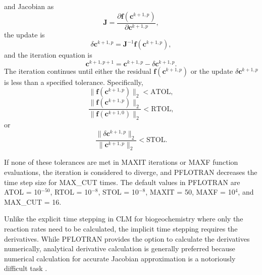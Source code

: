 \documentclass[gmd, manuscript]{copernicus}
\begin{document}
and Jacobian as
\begin{equation}
\mathbf{J} = \frac{\partial \mathbf{f}(\mathbf{c}^{k+1,p})}{\partial \mathbf{c}^{k+1,p}},
\label{eq:jacobian}
\end{equation}
the update is
\begin{equation}
\delta \mathbf{c}^{k+1,p}= \mathbf{J}^{-1} \mathbf{f} (\mathbf{c}^{k+1,p}),
\label{eq:axb}
\end{equation}
and the iteration equation is
\begin{equation}
\mathbf{c}^{k+1,p+1}=\mathbf{c}^{k+1,p}-\delta \mathbf{c}^{k+1,p}.
\label{eq:update}
\end{equation}
The iteration continues until either the residual
$\mathbf{f}(\mathbf{c}^{k+1,p} )$ or the update $\delta
\mathbf{c}^{k+1,p}$ is less than a specified tolerance. Specifically,
\begin{equation}
\|\mathbf{f}(\mathbf{c}^{k+1,p} )\|_2 < \text{ATOL},
\label{eq:atol}
\end{equation}
\begin{equation}
\frac{\|\mathbf{f}(\mathbf{c}^{k+1,p} )\|_2}{\|\mathbf{f}(\mathbf{c}^{k+1,0} )\|_2} < \text{RTOL},
\label{eq:rtol}
\end{equation}
or
\begin{equation}
\frac{\|\delta \mathbf{c}^{k+1,p} \|_2}{\|\mathbf{c}^{k+1,p} \|_2} < \text{STOL}.
\label{eq:stol}
\end{equation}

If none of these tolerances are met in MAXIT iterations or MAXF function
evaluations, the iteration is considered to diverge, and PFLOTRAN decreases the
time step size for MAX\_CUT times. The default values in PFLOTRAN are ATOL =
10$^{-50}$, RTOL = 10$^{-8}$, STOL = 10$^{-8}$,  %
MAXIT = 50, MAXF = 10$^4$, and MAX\_CUT = 16.

Unlike the explicit time stepping in CLM for biogeochemistry where only the
reaction rates need to be calculated, the implicit time stepping %
requires the derivatives.  While PFLOTRAN
provides the option to calculate the derivatives numerically, 
analytical derivative calculation is generally preferred \citep[e.g.,][]{Xu2006}
because numerical calculation for accurate Jacobian approximation is a
notoriously difficult task \citep{Shampine2005}. 
\end{document}
